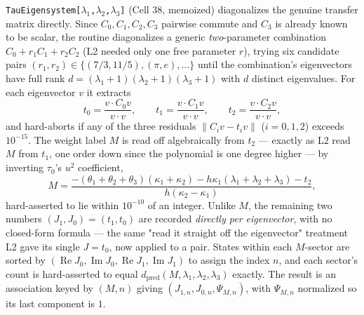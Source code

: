 \documentclass[11pt]{article}
\begin{document}
\texttt{TauEigensystem[$\lambda_1$,$\lambda_2$,$\lambda_3$]} (Cell 38, memoized) diagonalizes the
genuine transfer matrix directly. Since $C_0,C_1,C_2,C_3$ pairwise commute and $C_3$ is already known
to be scalar, the routine diagonalizes a generic \emph{two}-parameter combination
$C_0+r_1C_1+r_2C_2$ (L2 needed only one free parameter $r$), trying six candidate pairs
$(r_1,r_2)\in\{(7/3,11/5),(\pi,e),\dots\}$ until the combination's eigenvectors have full rank
$d=(\lambda_1+1)(\lambda_2+1)(\lambda_3+1)$ with $d$ distinct eigenvalues. For each eigenvector $v$ it
extracts
\[
  t_0=\frac{v\cdot C_0v}{v\cdot v}, \qquad t_1=\frac{v\cdot C_1v}{v\cdot v}, \qquad t_2=\frac{v\cdot C_2v}{v\cdot v},
\]
and hard-aborts if any of the three residuals $\|C_iv-t_iv\|$ ($i=0,1,2$) exceeds $10^{-15}$. The
weight label $M$ is read off algebraically from $t_2$ --- exactly as L2 read $M$ from $t_1$, one order
down since the polynomial is one degree higher --- by inverting $\tau_0$'s $u^2$ coefficient,
\begin{equation}
  M = \frac{-(\theta_1+\theta_2+\theta_3)(\kappa_1+\kappa_2) - h\kappa_1(\lambda_1+\lambda_2+\lambda_3) - t_2}
           {h(\kappa_2-\kappa_1)},
  \label{eq:Mextract}
\end{equation}
hard-asserted to lie within $10^{-10}$ of an integer. Unlike $M$, the remaining two numbers
$(J_1,J_0)=(t_1,t_0)$ are recorded \emph{directly per eigenvector}, with no closed-form formula ---
the same "read it straight off the eigenvector" treatment L2 gave its single $J=t_0$, now applied to
a pair. States within each $M$-sector are sorted by $(\operatorname{Re}J_0,\operatorname{Im}J_0,
\operatorname{Re}J_1,\operatorname{Im}J_1)$ to assign the index $n$, and each sector's count is
hard-asserted to equal $d_{\mathrm{pred}}(M,\lambda_1,\lambda_2,\lambda_3)$ exactly. The result is an
association keyed by $(M,n)$ giving $(J_{1,n},J_{0,n},\Psi_{M,n})$, with $\Psi_{M,n}$ normalized so
its last component is $1$.
\end{document}

